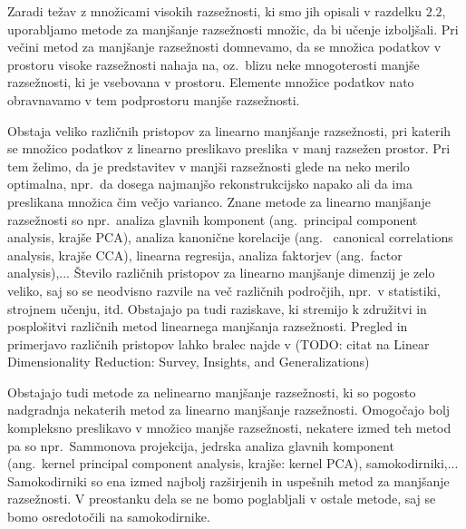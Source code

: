 \documentclass[12pt,a4paper]{article}
\begin{document}
Zaradi težav z množicami visokih razsežnosti, ki smo jih opisali v razdelku $2.2$, uporabljamo metode za manjšanje razsežnosti množic, da bi učenje izboljšali. 
Pri večini metod za manjšanje razsežnosti domnevamo, da se množica podatkov v prostoru visoke razsežnosti nahaja na, 
oz.~blizu neke mnogoterosti manjše razsežnosti, ki je vsebovana v prostoru. Elemente množice podatkov nato obravnavamo v tem podprostoru manjše razsežnosti.

Obstaja veliko različnih pristopov za linearno manjšanje razsežnosti, pri katerih se množico podatkov z linearno preslikavo preslika v manj razsežen prostor. 
Pri tem želimo, da je predstavitev v manjši razsežnosti glede na neko merilo optimalna, npr.\ da dosega najmanjšo rekonstrukcijsko napako ali da ima preslikana množica čim večjo varianco. 
Znane metode za linearno manjšanje razsežnosti so npr.\ analiza glavnih komponent (ang.~principal component analysis, krajše PCA), 
analiza kanonične korelacije (ang.~ canonical correlations analysis, krajše CCA), linearna regresija, analiza faktorjev (ang.~factor analysis),... 
Število različnih pristopov za linearno manjšanje dimenzij je zelo veliko, saj so se neodvisno razvile na več različnih področjih, npr.\ v statistiki, strojnem učenju, itd. 
Obstajajo pa tudi raziskave, ki stremijo k združitvi in posplošitvi različnih metod linearnega manjšanja razsežnosti. Pregled in primerjavo različnih pristopov lahko bralec najde v (TODO: citat na Linear Dimensionality Reduction: Survey, Insights, and Generalizations)

Obstajajo tudi metode za nelinearno manjšanje razsežnosti, ki so pogosto nadgradnja nekaterih metod za linearno manjšanje razsežnosti. 
Omogočajo bolj kompleksno preslikavo v množico manjše razsežnosti, nekatere izmed teh metod pa so npr.\ Sammonova projekcija, jedrska analiza glavnih komponent (ang.~kernel principal component analysis, krajše: kernel PCA), samokodirniki,...
Samokodirniki so ena izmed najbolj razširjenih in uspešnih metod za manjšanje razsežnosti. 
V preostanku dela se ne bomo poglabljali v ostale metode, saj se bomo osredotočili na samokodirnike.
\end{document}
